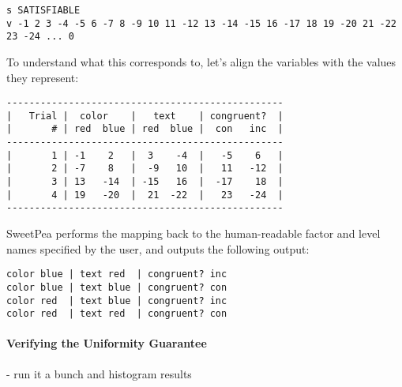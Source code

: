\begin{verbatim}
s SATISFIABLE
v -1 2 3 -4 -5 6 -7 8 -9 10 11 -12 13 -14 -15 16 -17 18 19 -20 21 -22 23 -24 ... 0
\end{verbatim}

To understand what this corresponds to, let's align the variables with the values they represent:

\begin{verbatim}
-------------------------------------------------
|   Trial |  color    |   text    | congruent?  |
|       # | red  blue | red  blue |  con   inc  |
-------------------------------------------------
|       1 | -1    2   |  3    -4  |   -5    6   |
|       2 | -7    8   |  -9   10  |   11   -12  |
|       3 | 13   -14  | -15   16  |  -17    18  |
|       4 | 19   -20  |  21  -22  |   23   -24  |
-------------------------------------------------
\end{verbatim}

SweetPea performs the mapping back to the human-readable factor and level names specified by the user, and outputs the following output:

\begin{verbatim}
color blue | text red  | congruent? inc
color blue | text blue | congruent? con
color red  | text blue | congruent? inc
color red  | text red  | congruent? con
\end{verbatim}


\paragraph*{Verifying the Uniformity Guarantee}

- run it a bunch and histogram results
